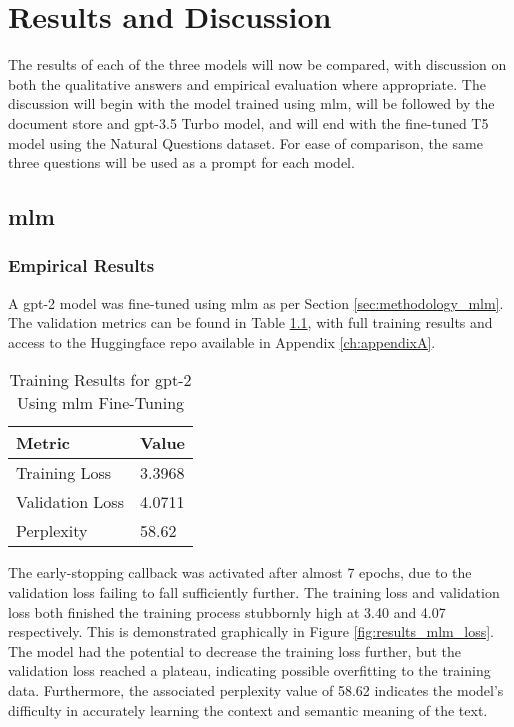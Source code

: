 \chapter{Results and Discussion}\label{ch:results}
The results of each of the three models will now be compared, with discussion on both the qualitative answers and empirical evaluation where appropriate. The discussion will begin with the model trained using \acrfull{mlm}, will be followed by the document store and \acrshort{gpt}-3.5 Turbo model, and will end with the fine-tuned T5 model using the Natural Questions dataset. For ease of comparison, the same three questions will be used as a prompt for each model.


\section{\acrlong{mlm}}\label{sec:results_mlm}
\subsection{Empirical Results}
A \acrshort{gpt}-2 model was fine-tuned using \acrlong{mlm} as per Section \ref{sec:methodology_mlm}. The validation metrics can be found in Table \ref{tab:results_mlm}, with full training results and access to the Huggingface repo available in Appendix \ref{ch:appendixA}.

\begin{table}[ht!]
    \centering
    \begin{tabular}{l|l}
        \textbf{Metric} & \textbf{Value} \\ \hline
        Training Loss & 3.3968 \\ \hline
        Validation Loss & 4.0711 \\ \hline
        Perplexity & 58.62 \\
    \end{tabular}
    \caption{Training Results for \acrshort{gpt}-2 Using \acrshort{mlm} Fine-Tuning}
    \label{tab:results_mlm}
\end{table}

The early-stopping callback was activated after almost 7 epochs, due to the validation loss failing to fall sufficiently further. The training loss and validation loss both finished the training process stubbornly high at 3.40 and 4.07 respectively. This is demonstrated graphically in Figure \ref{fig:results_mlm_loss}. The model had the potential to decrease the training loss further, but the validation loss reached a plateau, indicating possible overfitting to the training data. Furthermore, the associated perplexity value of 58.62 indicates the model's difficulty in accurately learning the context and semantic meaning of the text.


